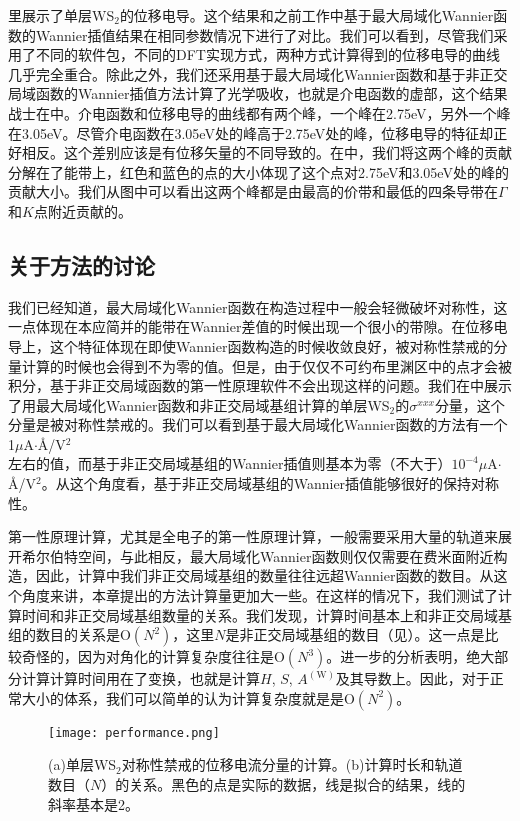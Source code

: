 里展示了单层WS$_2$的位移电导。这个结果和之前工作中基于最大局域化Wannier函数的Wannier插值结果在相同参数情况下进行了对比。我们可以看到，尽管我们采用了不同的软件包，不同的DFT实现方式，两种方式计算得到的位移电导的曲线几乎完全重合。除此之外，我们还采用基于最大局域化Wannier函数和基于非正交局域函数的Wannier插值方法计算了光学吸收，也就是介电函数的虚部，这个结果战士在中。介电函数和位移电导的曲线都有两个峰，一个峰在2.75eV，另外一个峰在3.05eV。尽管介电函数在3.05eV处的峰高于2.75eV处的峰，位移电导的特征却正好相反。这个差别应该是有位移矢量的不同导致的。在中，我们将这两个峰的贡献分解在了能带上，红色和蓝色的点的大小体现了这个点对2.75eV和3.05eV处的峰的贡献大小。我们从图中可以看出这两个峰都是由最高的价带和最低的四条导带在$\Gamma$和$K$点附近贡献的。


\subsection{关于方法的讨论}

我们已经知道，最大局域化Wannier函数在构造过程中一般会轻微破坏对称性，这一点体现在本应简并的能带在Wannier差值的时候出现一个很小的带隙。在位移电导上，这个特征体现在即使Wannier函数构造的时候收敛良好，被对称性禁戒的分量计算的时候也会得到不为零的值。但是，由于仅仅不可约布里渊区中的点才会被积分，基于非正交局域函数的第一性原理软件不会出现这样的问题。我们在中展示了用最大局域化Wannier函数和非正交局域基组计算的单层WS$_2$的$\sigma^{xxx}$分量，这个分量是被对称性禁戒的。我们可以看到基于最大局域化Wannier函数的方法有一个1$\mu$A$\cdot$\AA/V$^2$左右的值，而基于非正交局域基组的Wannier插值则基本为零（不大于）$10^{-4}\mu$A$\cdot$\AA/V$^2$。从这个角度看，基于非正交局域基组的Wannier插值能够很好的保持对称性。

第一性原理计算，尤其是全电子的第一性原理计算，一般需要采用大量的轨道来展开希尔伯特空间，与此相反，最大局域化Wannier函数则仅仅需要在费米面附近构造，因此，计算中我们非正交局域基组的数量往往远超Wannier函数的数目。从这个角度来讲，本章提出的方法计算量更加大一些。在这样的情况下，我们测试了计算时间和非正交局域基组数量的关系。我们发现，计算时间基本上和非正交局域基组的数目的关系是$\text{O}(N^2)$，这里$N$是非正交局域基组的数目（见）。这一点是比较奇怪的，因为对角化的计算复杂度往往是$\text{O}(N^3)$。进一步的分析表明，绝大部分计算计算时间用在了变换，也就是计算$H$, $S$, $A^{(\text{W})}$及其导数上。因此，对于正常大小的体系，我们可以简单的认为计算复杂度就是是$\text{O}(N^2)$。

\begin{figure}
    \texttt{[image: performance.png]}
    \centering
    \caption{(a)单层WS$_2$对称性禁戒的位移电流分量的计算。(b)计算时长和轨道数目（$N$）的关系。黑色的点是实际的数据，线是拟合的结果，线的斜率基本是2。\label{fig:performance}}
\end{figure}

